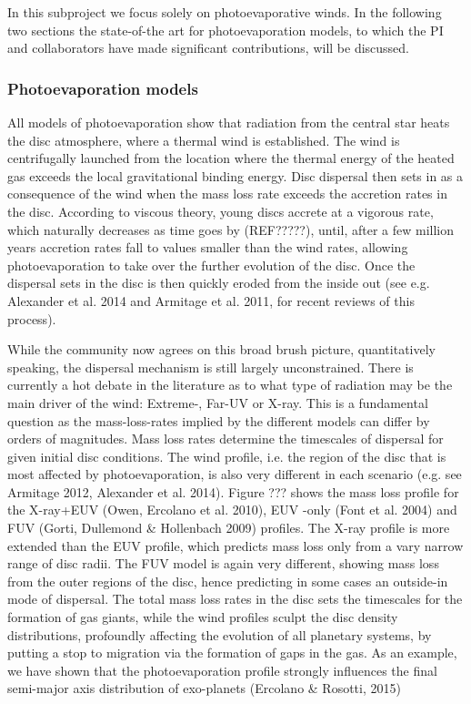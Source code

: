 \documentclass[10pt,fleqn,twoside]{article}
\begin{document}
In this subproject we focus solely on photoevaporative winds.
In the following two sections the state-of-the art for photoevaporation
models, to which the PI and collaborators have made significant contributions, will be discussed.
 
\subsubsection{Photoevaporation models} 

All models of photoevaporation show that radiation from the central
star heats the disc atmosphere, where a thermal  wind is established.
The wind is centrifugally launched from the location where the thermal
energy of the heated gas exceeds the local gravitational binding
energy. 
Disc dispersal then sets in as a consequence of the wind when the mass
loss rate exceeds the accretion rates in the disc. According to
viscous theory, young discs accrete
at a vigorous rate, which naturally decreases as time goes by (REF?????), until,
after a few million years accretion rates fall to values smaller than
the wind rates, allowing photoevaporation to take over the further
evolution of the disc. Once the dispersal sets in the disc is then
quickly eroded from the inside out (see e.g. Alexander et al. 2014 and
Armitage et al. 2011, for recent reviews of this process).  

While the community now agrees on this broad brush picture,
quantitatively speaking, the dispersal mechanism is still largely
unconstrained. There is currently a hot debate in the literature as to
what type of radiation may be the main driver of the wind: Extreme-,
Far-UV or X-ray. This is a fundamental question as the mass-loss-rates
implied by the different models can differ by orders of
magnitudes. Mass loss rates determine the timescales of dispersal for
given initial disc conditions. The wind profile, i.e. the region of
the disc that is most affected by photoevaporation, is also very
different in each scenario (e.g. see Armitage 2012, Alexander et
al. 2014). Figure ??? shows the mass loss profile for the X-ray+EUV
(Owen, Ercolano et al. 2010), EUV -only (Font et al. 2004) and FUV
(Gorti, Dullemond \& Hollenbach 2009) profiles. The X-ray profile is
more extended than the EUV profile, which predicts mass loss only from
a vary narrow range of disc radii. The FUV model is again very
different, showing mass loss from the outer regions of the disc, hence
predicting in some cases an outside-in mode of dispersal. The total
mass loss rates in the disc sets the timescales for the formation of
gas giants, while the wind
profiles sculpt the disc density distributions, profoundly affecting
the evolution of all planetary systems, by putting a stop to migration via
the formation of gaps in the gas. As an example, we have shown that
the photoevaporation profile strongly influences the final semi-major
axis distribution of exo-planets (Ercolano \& Rosotti, 2015) 
\end{document}

